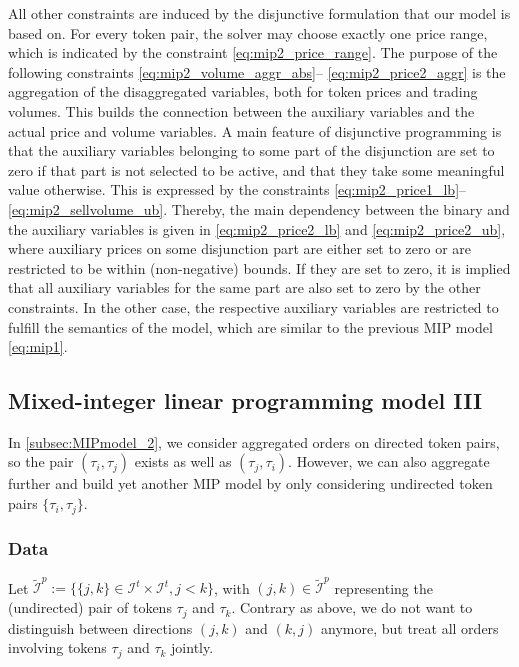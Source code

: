 \documentclass[11pt,parskip=full]{scrartcl}%
\newcommand*{\itokens}{\mathcal{I}^t}       %
\newcommand*{\iutokenpairs}{\tilde{\mathcal{I}}^p}   %
\begin{document}
All other constraints are induced by the disjunctive formulation that our model is based on.
For every token pair, the solver may choose exactly one price range, which is indicated by the
constraint \eqref{eq:mip2_price_range}.
The purpose of the following constraints \eqref{eq:mip2_volume_aggr_abs}--
\eqref{eq:mip2_price2_aggr} is the aggregation of the disaggregated variables, both for token
prices and trading volumes.
This builds the connection between the auxiliary variables and the actual price and volume
variables.
A main feature of disjunctive programming is that the auxiliary variables belonging to some part of
the disjunction are set to zero if that part is not selected to be active, and that they take
some meaningful value otherwise.
This is expressed by the constraints \eqref{eq:mip2_price1_lb}--\eqref{eq:mip2_sellvolume_ub}.
Thereby, the main dependency between the binary and the auxiliary variables is given in
\eqref{eq:mip2_price2_lb} and \eqref{eq:mip2_price2_ub}, where auxiliary prices on some disjunction
part are either set to zero or are restricted to be within (non-negative) bounds.
If they are set to zero, it is implied that all auxiliary variables for the same part are also set
to zero by the other constraints.
In the other case, the respective auxiliary variables are restricted to fulfill the semantics of
the model, which are similar to the previous MIP model \eqref{eq:mip1}.



\subsection{Mixed-integer linear programming model III}
\label{subsec:MIPmodel_3}

In \ref{subsec:MIPmodel_2}, we consider aggregated orders on directed token pairs, so the pair $
(\tau_i,\tau_j) $ exists as well as $ (\tau_j,\tau_i) $.
However, we can also aggregate further and build yet another MIP model by only considering
undirected token pairs $ \{\tau_i,\tau_j\} $.

\subsubsection*{Data}

Let $ \iutokenpairs := \{\{j,k\} \in \itokens \times \itokens, j < k\} $, with $ (j,k) \in
\iutokenpairs $ representing the (undirected) pair of tokens $ \tau_j $ and $ \tau_k $.
Contrary as above, we do not want to distinguish between directions $ (j,k) $ and $ (k,j) $
anymore, but treat all orders involving tokens $ \tau_j $ and $ \tau_k $ jointly.
\end{document}
